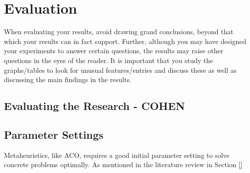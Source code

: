 \section{Evaluation}

When evaluating your results, avoid drawing grand conclusions, beyond that which your results can in fact support. Further, although you may have designed your experiments to answer certain questions, the results may raise other questions in the eyes of the reader. It is important that you study the graphs/tables to look for unusual features/entries and discuss these as well as discussing the main findings in the results. 

\subsection{Evaluating the Research - COHEN}




\citep{cohen88}

\subsection{Parameter Settings}

Metaheuristics, like ACO, requires a good initial parameter setting to solve concrete problems optimally. As mentioned in the literature review in Section \vref{}

